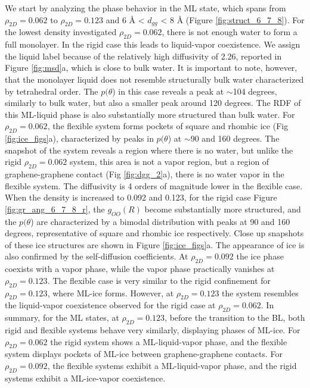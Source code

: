 \documentclass[journal=acsnano,manuscript=article]{achemso}
\begin{document}
We start by analyzing the phase behavior in the ML state, which spans from \(\rho_{2D}=0.062\) to \(\rho_{2D}=0.123\) and 6 \r A < \(d_{gg}\) < 8 \r A (Figure \ref{fig:struct_6_7_8}). For the lowest density investigated \(\rho_{2D}=0.062\), there is not enough water to form a full monolayer. In the rigid case this leads to liquid-vapor coexistence. We assign the liquid label because of the relatively high diffusivity of 2.26, reported in Figure \ref{fig:msd}a, which is close to bulk water. It is important to note, however, that the monolayer liquid does not resemble structurally bulk water characterized by tetrahedral order. The \(p(\theta\)) in this case reveals a peak at \(\sim\)104 degrees, similarly to bulk water, but also a smaller peak around 120 degrees. The RDF of this ML-liquid phase is also substantially more structured than bulk water. For \(\rho_{2D}=0.062\), the flexible system forms pockets of square and rhombic ice (Fig \ref{fig:ice_figs}a), characterized by peaks in \(p(\theta\)) at \(\sim\)90 and 160 degrees. The snapshot of the system reveals a region where there is no water, but unlike the rigid \(\rho_{2D}=0.062\) system, this area is not a vapor region, but a region of graphene-graphene contact (Fig \ref{fig:dgg_2}a), there is no water vapor in the flexible system. The diffusivity is 4 orders of magnitude lower in the flexible case. When the density is increased to 0.092 and 0.123, for the rigid case Figure \ref{fig:gr_ang_6_7_8_r}, the \(g_{OO}(R)\) become substantially more structured, and the \(p(\theta\)) are characterized by a bimodal distribution with peaks at 90 and 160 degrees, representative of square and rhombic ice respectively. Close up snapshots of these ice structures are shown in Figure \ref{fig:ice_figs}a. The appearance of ice is also confirmed by the self-diffusion coefficients. At \(\rho_{2D}=0.092\) the ice phase coexists with a vapor phase, while the vapor phase practically vanishes at \(\rho_{2D}=0.123\). The flexible case is very similar to the rigid confinement for \(\rho_{2D}=0.123\), where ML-ice forms. However, at \(\rho_{2D}=0.123\) the system resembles the liquid-vapor coexistence observed for the rigid case at \(\rho_{2D}=0.062\). In summary, for the ML states, at \(\rho_{2D}=0.123\), before the transition to the BL, both rigid and flexible systems behave very similarly, displaying phases of ML-ice. For \(\rho_{2D}=0.062\) the rigid system shows a ML-liquid-vapor phase, and the flexible system displays pockets of ML-ice between graphene-graphene contacts. For \(\rho_{2D}=0.092\), the flexible systems exhibit a ML-liquid-vapor phase, and the rigid systems exhibit a ML-ice-vapor coexistence. 
	
\end{document}
